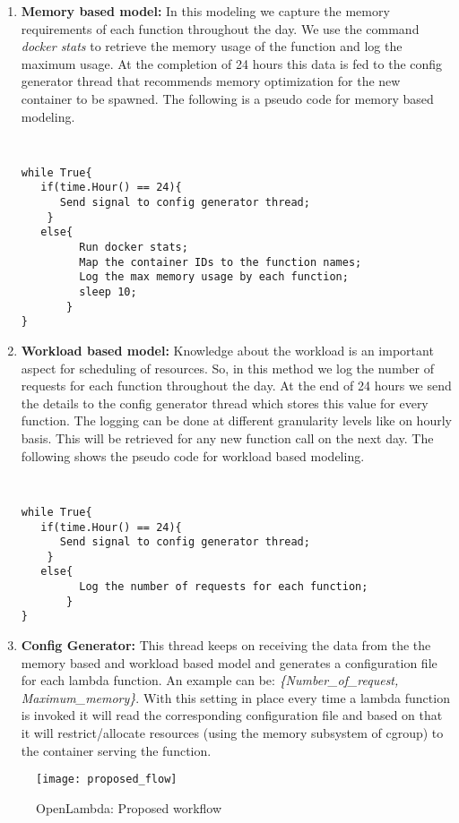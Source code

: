 \documentclass[letterpaper,twocolumn,10pt]{article}
\begin{document}
\begin{enumerate}
\item\textbf{ Memory based model:} 
In this modeling we capture the memory requirements of each function throughout the day. We use the command \textit{docker stats} to retrieve the memory usage of the function and log the maximum usage. At the completion of 24 hours this data is fed to the config generator thread that recommends memory optimization for the new container to be spawned. The following is a pseudo code for memory based modeling. 
{\tt \small
\begin{verbatim}
while True{
   if(time.Hour() == 24){
	  Send signal to config generator thread;
	}
   else{
		 Run docker stats;
		 Map the container IDs to the function names;
		 Log the max memory usage by each function;
		 sleep 10;
	   }
}
\end{verbatim}
}

\item \textbf{Workload based model:}
Knowledge about the workload is an important aspect for scheduling of resources. So, in this method we log the number of requests for each function throughout the day. At the end of 24 hours we send the details to the config generator thread which stores this value for every function. The logging can be done at different granularity levels like on hourly basis. This will be retrieved for any new function call on the next day. The following shows the pseudo code for workload based modeling. 
{\tt \small
\begin{verbatim}
while True{
   if(time.Hour() == 24){
	  Send signal to config generator thread;
	}
   else{
		 Log the number of requests for each function;
	   }
}
\end{verbatim}
}

\item \textbf{Config Generator:}
This thread keeps on receiving the data from the the memory based and workload based model  and generates a configuration file for each lambda function. An example can be: \textit{\{Number\_of\_request, Maximum\_memory\}}. With this setting in place every time a lambda function is invoked it will read the corresponding configuration file and based on that it will restrict/allocate resources (using the memory subsystem of cgroup) to the container serving the function.
\end{enumerate}
\begin{figure}[H]
\texttt{[image: proposed\_flow]}
    \caption{OpenLambda: Proposed workflow}
    \label{fig:Figure6}
\end{figure}
\end{document}
